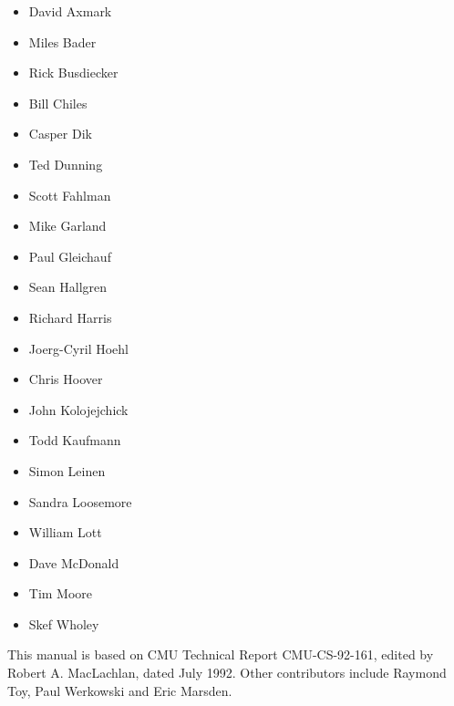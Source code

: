 \begin{itemize}
\item David Axmark
\item Miles Bader
\item Rick Busdiecker
\item Bill Chiles
\item Casper Dik
\item Ted Dunning
\item Scott Fahlman
\item Mike Garland
\item Paul Gleichauf
\item Sean Hallgren
\item Richard Harris
\item Joerg-Cyril Hoehl
\item Chris Hoover
\item John Kolojejchick
\item Todd Kaufmann
\item Simon Leinen
\item Sandra Loosemore
\item William Lott
\item Dave McDonald
\item Tim Moore
\item Skef Wholey
\end{itemize}

This manual is based on CMU Technical Report CMU-CS-92-161, edited by
Robert A. MacLachlan, dated July 1992. Other contributors include
Raymond Toy, Paul Werkowski and Eric Marsden.

